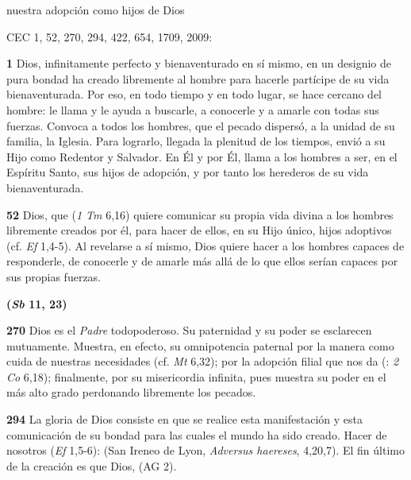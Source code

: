 \begin{body}
\begin{body}
nuestra adopción como hijos de Dios

CEC 1, 52, 270, 294, 422, 654, 1709, 2009:

\textbf{1} Dios, infinitamente perfecto y bienaventurado en sí mismo, en un designio de pura bondad ha creado libremente al hombre para hacerle partícipe de su vida bienaventurada. Por eso, en todo tiempo y en todo lugar, se hace cercano del hombre: le llama y le ayuda a buscarle, a conocerle y a amarle con todas sus fuerzas. Convoca a todos los hombres, que el pecado dispersó, a la unidad de su familia, la Iglesia. Para lograrlo, llegada la plenitud de los tiempos, envió a su Hijo como Redentor y Salvador. En Él y por Él, llama a los hombres a ser, en el Espíritu Santo, sus hijos de adopción, y por tanto los herederos de su vida bienaventurada.

\textbf{52} Dios, que  (\emph{1 Tm} 6,16) quiere comunicar su propia vida divina a los hombres libremente creados por él, para hacer de ellos, en su Hijo único, hijos adoptivos (cf. \emph{Ef} 1,4-5). Al revelarse a sí mismo, Dios quiere hacer a los hombres capaces de responderle, de conocerle y de amarle más allá de lo que ellos serían capaces por sus propias fuerzas.

\textbf{ (\emph{Sb} 11, 23)}

\textbf{270} Dios es el \emph{Padre} todopoderoso. Su paternidad y su poder se esclarecen mutuamente. Muestra, en efecto, su omnipotencia paternal por la manera como cuida de nuestras necesidades (cf. \emph{Mt} 6,32); por la adopción filial que nos da (: \emph{2 Co} 6,18); finalmente, por su misericordia infinita, pues muestra su poder en el más alto grado perdonando libremente los pecados.

\textbf{294} La gloria de Dios consiste en que se realice esta manifestación y esta comunicación de su bondad para las cuales el mundo ha sido creado. Hacer de nosotros  (\emph{Ef} 1,5-6):  (San Ireneo de Lyon, \emph{Adversus haereses}, 4,20,7). El fin último de la creación es que Dios,  (AG 2).


\end{body}
\end{body}
